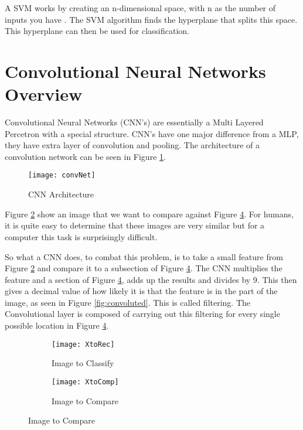 A SVM works by creating an n-dimensional space, with n as the number of
inputs you have \textcite{svm}. The SVM algorithm finds the hyperplane that splits this space.
This hyperplane can then be used for classification.

\section{Convolutional Neural Networks Overview}
Convolutional Neural Networks (CNN's) are essentially a Multi Layered Percetron with a
special structure. CNN's have one major difference from a MLP, they have extra
layer of convolution and pooling. The architecture of a convolution network can
be seen in Figure \ref{fig:convNet}.

\begin{figure}
	\texttt{[image: convNet]}
	\caption{CNN Architecture}
	\label{fig:convNet}
\end{figure}

Figure \ref{fig:XtoRec} show an image that we want to compare against
Figure \ref{fig:XtoComp}.
For humans, it is quite easy to determine that these images are very similar but
for a computer this task is surprisingly difficult.

So what a CNN does, to combat this problem, is to take a small feature from
Figure \ref{fig:XtoRec} and compare it to a subsection of Figure \ref{fig:XtoComp}.
The CNN multiplies the feature and a section of Figure \ref{fig:XtoComp}, adds
up the results and divides by 9. This then gives a decimal value of how likely
it is that the feature is in the part of the image, as seen in Figure
\ref{fig:convoluted}.
This is called filtering. The Convolutional layer is composed of carrying out
this filtering for every single possible location in Figure \ref{fig:XtoComp}.
\begin{figure}
	\caption{Image filtering}
    \label{fig:filter}
      \begin{subfigure}[b]{0.4\textwidth}
          \texttt{[image: XtoRec]}
          \caption{Image to Classify}
          \label{fig:XtoRec}
      \end{subfigure}
      \begin{subfigure}[b]{0.4\textwidth}
      \texttt{[image: XtoComp]}
      \caption{Image to Compare}
      \label{fig:XtoComp}
      \end{subfigure}
\end{figure}

